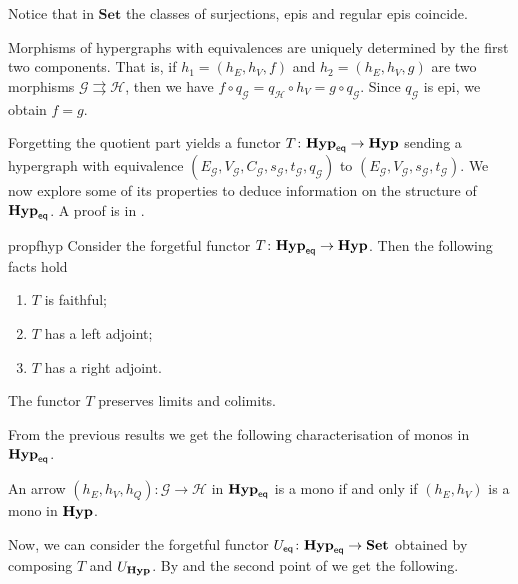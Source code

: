 \documentclass[3p]{elsarticle}
\newcommand{\eq}{\mathsf{eq}}
\newcommand{\Set}{\mathbf{Set}}
\newcommand{\catname}[1]{\textbf{\textup{#1}}}
\newcommand{\hyp}{\catname{Hyp}}
\newcommand{\EqHyp}{\catname{Hyp}_{\mathsf{eq}}} %
\theoremstyle{remark}
\theoremstyle{definition}
\begin{document}
\begin{rem}
	Notice that in $\Set$ the classes of surjections, epis and regular epis coincide.
\end{rem}

\begin{rem}\label{rem:eqhyp_morphs}
	Morphisms of hypergraphs with equivalences are uniquely determined by the first two components. That is, if $h_1 = (h_E, h_V, f)$ and $h_2 = (h_E, h_V, g)$ are two morphisms $\mathcal{G} \rightrightarrows \mathcal{H}$, then we have
	$
	f \circ q_\mathcal{G} = q_\mathcal{H}\circ h_V =g\circ q_\mathcal{G}.
	$
	Since $q_\mathcal{G}$ is epi, we obtain $f = g$.
\end{rem}

Forgetting the quotient part yields a functor $T\colon \EqHyp \to \hyp$ sending a hypergraph with equivalence $(E_\mathcal{G}, V_{\mathcal{G}}, C_\mathcal{G}, s_\mathcal{G}, t_\mathcal{G}, q_\mathcal{G})$ to $(E_{\mathcal{G}}, V_{\mathcal{G}}, s_\mathcal{G}, t_{\mathcal{G}})$.   We now explore some of its properties to deduce information on the structure of $\EqHyp$.  
%
A proof is in .


\begin{restatable}{prop}{fhyp}\label{prop:forghyp}  Consider the forgetful functor $T\colon \EqHyp \to \hyp$. Then the following facts hold
	\begin{enumerate}
		\item$T$ is faithful;
		\item $T$ has a left adjoint;
		\item $T$ has a right adjoint.
	\end{enumerate}
\end{restatable}

\begin{cor}\label{cor:limcolim}
	The functor $T$ preserves limits and colimits.
\end{cor}

From the previous results we get the following characterisation of monos in $\EqHyp$.

\begin{cor}\label{cor:mono1}
	An arrow $(h_E, h_V, h_Q): \mathcal{G \to H}$ in $\EqHyp$ is a mono if and only if $(h_E, h_V)$ is a mono in $\hyp$.
\end{cor}

Now, we can consider the forgetful functor $U_{\eq}\colon \EqHyp\to \Set$ obtained by composing $T$ and $U_{\hyp}$.  By  and the second point of  we get the following.
\end{document}
